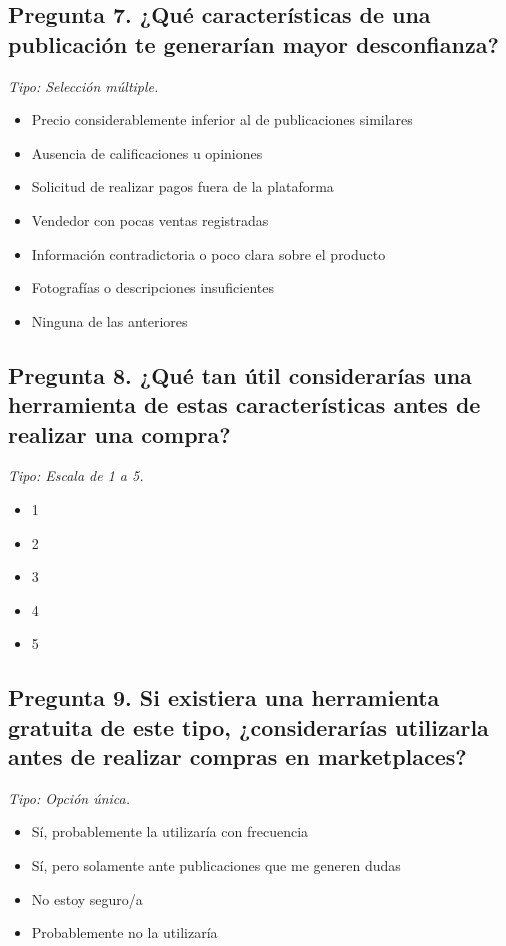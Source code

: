 \subsection*{Pregunta 7. ¿Qué características de una publicación te generarían mayor desconfianza?}
\noindent\textit{Tipo: Selección múltiple.}
\begin{itemize}\setlength\itemsep{1pt}
\item Precio considerablemente inferior al de publicaciones similares
\item Ausencia de calificaciones u opiniones
\item Solicitud de realizar pagos fuera de la plataforma
\item Vendedor con pocas ventas registradas
\item Información contradictoria o poco clara sobre el producto
\item Fotografías o descripciones insuficientes
\item Ninguna de las anteriores
\end{itemize}
\subsection*{Pregunta 8. ¿Qué tan útil considerarías una herramienta de estas características antes de realizar una compra?}
\noindent\textit{Tipo: Escala de 1 a 5.}
\begin{itemize}\setlength\itemsep{1pt}
\item 1
\item 2
\item 3
\item 4
\item 5
\end{itemize}
\subsection*{Pregunta 9. Si existiera una herramienta gratuita de este tipo, ¿considerarías utilizarla antes de realizar compras en marketplaces?}
\noindent\textit{Tipo: Opción única.}
\begin{itemize}\setlength\itemsep{1pt}
\item Sí, probablemente la utilizaría con frecuencia
\item Sí, pero solamente ante publicaciones que me generen dudas
\item No estoy seguro/a
\item Probablemente no la utilizaría
\end{itemize}
